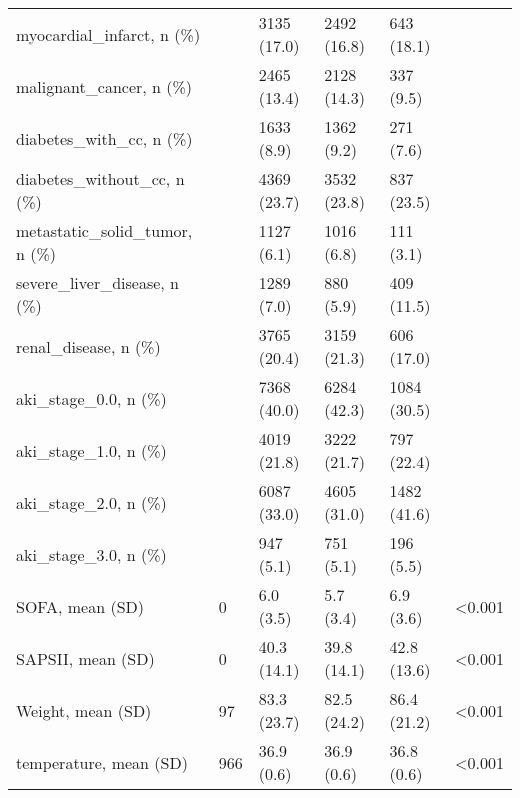 \begin{tabular}{llllll}
myocardial\_infarct, n (\%)                         &         &    3135 (17.0) &       2492 (16.8) &             643 (18.1) &         \\
malignant\_cancer, n (\%)                           &         &    2465 (13.4) &       2128 (14.3) &              337 (9.5) &         \\
diabetes\_with\_cc, n (\%)                           &         &     1633 (8.9) &        1362 (9.2) &              271 (7.6) &         \\
diabetes\_without\_cc, n (\%)                        &         &    4369 (23.7) &       3532 (23.8) &             837 (23.5) &         \\
metastatic\_solid\_tumor, n (\%)                     &         &     1127 (6.1) &        1016 (6.8) &              111 (3.1) &         \\
severe\_liver\_disease, n (\%)                       &         &     1289 (7.0) &         880 (5.9) &             409 (11.5) &         \\
renal\_disease, n (\%)                              &         &    3765 (20.4) &       3159 (21.3) &             606 (17.0) &         \\
aki\_stage\_0.0, n (\%)                              &         &    7368 (40.0) &       6284 (42.3) &            1084 (30.5) &         \\
aki\_stage\_1.0, n (\%)                              &         &    4019 (21.8) &       3222 (21.7) &             797 (22.4) &         \\
aki\_stage\_2.0, n (\%)                              &         &    6087 (33.0) &       4605 (31.0) &            1482 (41.6) &         \\
aki\_stage\_3.0, n (\%)                              &         &      947 (5.1) &         751 (5.1) &              196 (5.5) &         \\
SOFA, mean (SD)                                   &       0 &      6.0 (3.5) &         5.7 (3.4) &              6.9 (3.6) &  <0.001 \\
SAPSII, mean (SD)                                 &       0 &    40.3 (14.1) &       39.8 (14.1) &            42.8 (13.6) &  <0.001 \\
Weight, mean (SD)                                 &      97 &    83.3 (23.7) &       82.5 (24.2) &            86.4 (21.2) &  <0.001 \\
temperature, mean (SD)                            &     966 &     36.9 (0.6) &        36.9 (0.6) &             36.8 (0.6) &  <0.001 \\

\end{tabular}
